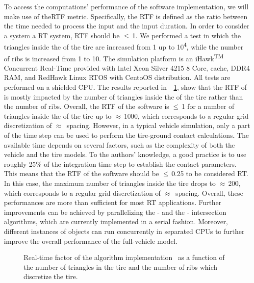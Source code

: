To access the computations' performance of the \Enve{} \cpp{} software implementation, we will make use of the\ac{RTF} metric. Specifically, the \ac{RTF} is defined as the ratio between the time needed to process the input and the input duration. In order to consider a system a \ac{RT} system, \ac{RTF} should be $\leq$\,1. We performed a test in which the triangles inside the \Aabb{} of the tire are increased from 1 up to 10\textsuperscript{4}, while the number of ribs is increased from 1 to 10. The simulation platform is an iHawk\textsuperscript{TM} Concurrent Real-Time provided with  Intel Xeon Silver 4215 8 Core,  cache,  DDR4 \ac{RAM}, and  RedHawk Linux RTOS with CentoOS distribution. All tests are performed on a shielded CPU. The results reported in~\figurename{}~\ref{app2:fig:rtf_enve}, show that the \ac{RTF} of \Enve{} is mostly impacted by the number of triangles inside the \Aabb{} of the tire rather than the number of ribs. Overall, the \ac{RTF} of the software is $\leq$\,1 for a number of triangles inside the \Aabb{} of the tire up to $\approx$\,1000, which corresponds to a regular grid discretization of $\approx$\, spacing. However, in a typical vehicle simulation, only a part of the time step can be used to perform the tire-ground contact calculations. The available time depends on several factors, such as the complexity of both the vehicle and the tire models. To the authors' knowledge, a good practice is to use roughly 25\% of the integration time step to establish the contact parameters. This means that the \ac{RTF} of the software should be $\leq$\,0.25 to be considered \ac{RT}. In this case, the maximum number of triangles inside the tire \Aabb{} drops to $\approx$\,200, which corresponds to a regular grid discretization of $\approx$\, spacing. Overall, these performances are more than sufficient for most \ac{RT} applications. Further improvements can be achieved by parallelizing the \AabbTree{}-\Aabb{} and the \Rib{}-\TriangleGround{} intersection algorithms, which are currently implemented in a serial fashion. Moreover, different instances of \Enve{} objects can run concurrently in separated CPUs to further improve the overall performance of the full-vehicle model.

\begin{figure}[!htp]
  \centering
  \caption{Real-time factor of the \Enve{} algorithm \cpp{} implementation~\cite{enve} as a function of the number of triangles in the tire \Aabb{} and the number of ribs which discretize the tire.}
  \label{app2:fig:rtf_enve}
\end{figure}

